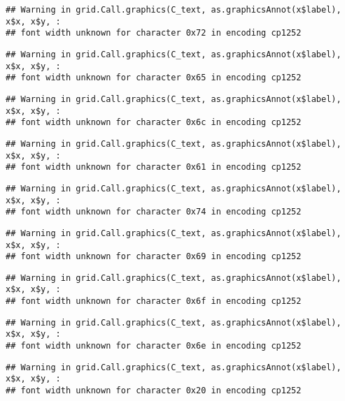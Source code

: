 \documentclass[
]{article}
\begin{document}
\begin{verbatim}
## Warning in grid.Call.graphics(C_text, as.graphicsAnnot(x$label), x$x, x$y, :
## font width unknown for character 0x72 in encoding cp1252
\end{verbatim}

\begin{verbatim}
## Warning in grid.Call.graphics(C_text, as.graphicsAnnot(x$label), x$x, x$y, :
## font width unknown for character 0x65 in encoding cp1252
\end{verbatim}

\begin{verbatim}
## Warning in grid.Call.graphics(C_text, as.graphicsAnnot(x$label), x$x, x$y, :
## font width unknown for character 0x6c in encoding cp1252
\end{verbatim}

\begin{verbatim}
## Warning in grid.Call.graphics(C_text, as.graphicsAnnot(x$label), x$x, x$y, :
## font width unknown for character 0x61 in encoding cp1252
\end{verbatim}

\begin{verbatim}
## Warning in grid.Call.graphics(C_text, as.graphicsAnnot(x$label), x$x, x$y, :
## font width unknown for character 0x74 in encoding cp1252
\end{verbatim}

\begin{verbatim}
## Warning in grid.Call.graphics(C_text, as.graphicsAnnot(x$label), x$x, x$y, :
## font width unknown for character 0x69 in encoding cp1252
\end{verbatim}

\begin{verbatim}
## Warning in grid.Call.graphics(C_text, as.graphicsAnnot(x$label), x$x, x$y, :
## font width unknown for character 0x6f in encoding cp1252
\end{verbatim}

\begin{verbatim}
## Warning in grid.Call.graphics(C_text, as.graphicsAnnot(x$label), x$x, x$y, :
## font width unknown for character 0x6e in encoding cp1252
\end{verbatim}

\begin{verbatim}
## Warning in grid.Call.graphics(C_text, as.graphicsAnnot(x$label), x$x, x$y, :
## font width unknown for character 0x20 in encoding cp1252
\end{verbatim}
\end{document}
